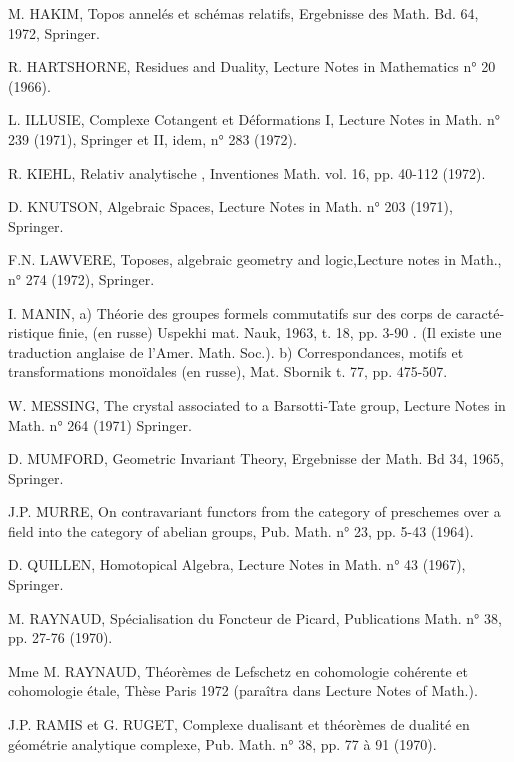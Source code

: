 
M. HAKIM, Topos annelés et schémas relatifs, Ergebnisse des Math. Bd. 64, 1972,
Springer.

R. HARTSHORNE, Residues and Duality, Lecture Notes in Mathematics n° 20 (1966).

L. ILLUSIE, Complexe Cotangent et Déformations I, Lecture Notes in Math. n° 239
(1971), Springer et II, idem, n° 283 (1972).

R. KIEHL, Relativ analytische , Inventiones Math. vol. 16, pp. 40-112
(1972).

D. KNUTSON, Algebraic Spaces, Lecture Notes in Math. n° 203 (1971), Springer.

F.N. LAWVERE, Toposes, algebraic geometry and logic,Lecture notes in Math.,
n° 274 (1972), Springer.

I. MANIN, a) Théorie des groupes formels commutatifs sur des corps de caracté-%
ristique finie, (en russe) Uspekhi mat. Nauk, 1963, t. 18,
pp. 3-90 . (Il existe une traduction anglaise de  l'Amer. Math. Soc.).
b) Correspondances, motifs et transformations monoïdales (en russe),
Mat. Sbornik t. 77, pp. 475-507.

W. MESSING, The crystal associated to a Barsotti-Tate group, Lecture Notes in
Math. n° 264 (1971) Springer.

D. MUMFORD, Geometric Invariant Theory, Ergebnisse der Math. Bd 34, 1965,
Springer.

J.P. MURRE, On contravariant functors from the category of preschemes over a
field into the category of abelian groups, Pub. Math. n° 23,
pp. 5-43 (1964).

D. QUILLEN, Homotopical Algebra, Lecture Notes in Math. n° 43 (1967), Springer.

M. RAYNAUD, Spécialisation du Foncteur de Picard, Publications Math. n° 38,
pp. 27-76 (1970).

Mme M. RAYNAUD, Théorèmes de Lefschetz en cohomologie cohérente et cohomologie
étale, Thèse Paris 1972 (paraîtra dans Lecture Notes of Math.).

J.P. RAMIS et G. RUGET, Complexe dualisant et théorèmes de dualité en géométrie
analytique complexe, Pub. Math. n° 38, pp. 77 à 91 (1970).

